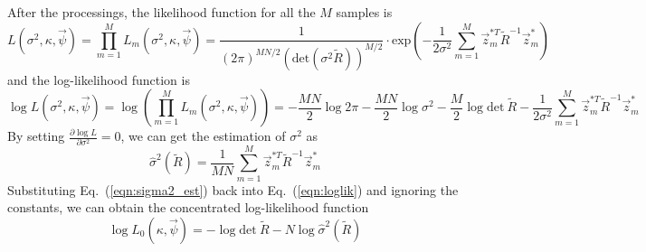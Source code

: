 \documentclass[referee]{ieice}
\begin{document}
After the processings, the likelihood function for all the $M$ samples is~\cite{Anderson03}
\begin{equation}
L(\sigma^2,\kappa,\vec{\psi}) = \prod_{m=1}^{M}L_m(\sigma^2,\kappa,\vec{\psi})=\frac{1}{(2\pi)^{MN/2}(\mathrm{det}(\sigma^2 \tilde{R}))^{M/2}} \cdot \mathrm{exp}\left(-\frac{1}{2\sigma^2}\sum_{m=1}^{M}\vec{z}_m^{*T} \tilde{R}^{-1}\vec{z}_m^* \right)
\end{equation}
and the log-likelihood function is
\begin{equation} \label{eqn:loglik}
\log L(\sigma^2,\kappa,\vec{\psi}) = \log \left(\prod_{m=1}^{M}L_m(\sigma^2,\kappa,\vec{\psi})\right)=-\frac{MN}{2}\log 2\pi-\frac{MN}{2}\log\sigma^2-\frac{M}{2}\log \mathrm{det}~\tilde{R}-\frac{1}{2\sigma^2}\sum_{m=1}^{M}\vec{z}_m^{*T} \tilde{R}^{-1}\vec{z}_m^*
\end{equation}
By setting $\frac{\partial \log L}{\partial \sigma^2}=0$, we can get the estimation of $\sigma^2$ as
\begin{equation} \label{eqn:sigma2_est}
\hat{\sigma}^2(\tilde{R})=\frac{1}{MN}\sum_{m=1}^{M}\vec{z}_m^{*T} \tilde{R}^{-1}\vec{z}_m^*
\end{equation}
Substituting Eq.~(\ref{eqn:sigma2_est}) back into Eq.~(\ref{eqn:loglik}) and ignoring the constants,
we can obtain the concentrated log-likelihood function
\begin{equation} \label{eqn:con_loglik}
\log L_0(\kappa,\vec{\psi})=-\log \mathrm{det}~\tilde{R} - N\log \hat{\sigma}^2(\tilde{R})
\end{equation}
\end{document}
